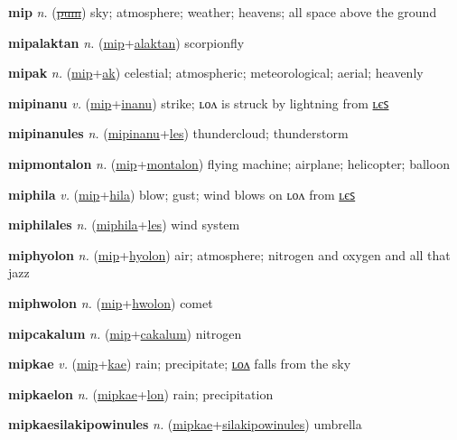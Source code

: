 \textbf{\hypertarget{mip}{mip}} \textit{n.} (\hyperlink{pum}{\sout{pum}})
sky; atmosphere; weather; heavens; all space above the ground

\textbf{\hypertarget{mipalaktan}{mipalaktan}} \textit{n.} (\hyperlink{mip}{mip}+\allowbreak \hyperlink{alaktan}{alaktan})
scorpionfly

\textbf{\hypertarget{mipak}{mipak}} \textit{n.} (\hyperlink{mip}{mip}+\allowbreak \hyperlink{ak}{ak})
celestial; atmospheric; meteorological; aerial; heavenly

\textbf{\hypertarget{mipinanu}{mipinanu}} \textit{v.} (\hyperlink{mip}{mip}+\allowbreak \hyperlink{inanu}{inanu})
strike; ʟᴏᴧ is struck by lightning from \hyperlink{mipinanules}{ʟєꜱ}

\textbf{\hypertarget{mipinanules}{mipinanules}} \textit{n.} (\hyperlink{mipinanu}{mipinanu}+\allowbreak \hyperlink{les}{les})
thundercloud; thunderstorm

\textbf{\hypertarget{mipmontalon}{mipmontalon}} \textit{n.} (\hyperlink{mip}{mip}+\allowbreak \hyperlink{montalon}{montalon})
flying machine; airplane; helicopter; balloon

\textbf{\hypertarget{miphila}{miphila}} \textit{v.} (\hyperlink{mip}{mip}+\allowbreak \hyperlink{hila}{hila})
blow; gust; wind blows on ʟᴏᴧ from \hyperlink{miphilales}{ʟєꜱ}

\textbf{\hypertarget{miphilales}{miphilales}} \textit{n.} (\hyperlink{miphila}{miphila}+\allowbreak \hyperlink{les}{les})
wind system

\textbf{\hypertarget{miphyolon}{miphyolon}} \textit{n.} (\hyperlink{mip}{mip}+\allowbreak \hyperlink{hyolon}{hyolon})
air; atmosphere; nitrogen and oxygen and all that jazz

\textbf{\hypertarget{miphwolon}{miphwolon}} \textit{n.} (\hyperlink{mip}{mip}+\allowbreak \hyperlink{hwolon}{hwolon})
comet

\textbf{\hypertarget{mipcakalum}{mipcakalum}} \textit{n.} (\hyperlink{mip}{mip}+\allowbreak \hyperlink{cakalum}{cakalum})
nitrogen

\textbf{\hypertarget{mipkae}{mipkae}} \textit{v.} (\hyperlink{mip}{mip}+\allowbreak \hyperlink{kae}{kae})
rain; precipitate; \hyperlink{mipkaelon}{ʟᴏᴧ} falls from the sky

\textbf{\hypertarget{mipkaelon}{mipkaelon}} \textit{n.} (\hyperlink{mipkae}{mipkae}+\allowbreak \hyperlink{lon}{lon})
rain; precipitation

\textbf{\hypertarget{mipkaesilakipowinules}{mipkaesilakipowinules}} \textit{n.} (\hyperlink{mipkae}{mipkae}+\allowbreak \hyperlink{silakipowinules}{silakipowinules})
umbrella

